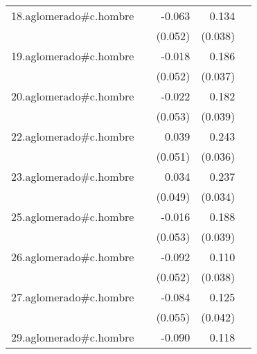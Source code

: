 {\begin{longtable}{l*{4}{D{.}{.}{-1}}}
\addlinespace
18.aglomerado#c.hombre&                     &      -0.063         &       0.134\sym{***}&                     \\
            &                     &     (0.052)         &     (0.038)         &                     \\
\addlinespace
19.aglomerado#c.hombre&                     &      -0.018         &       0.186\sym{***}&                     \\
            &                     &     (0.052)         &     (0.037)         &                     \\
\addlinespace
20.aglomerado#c.hombre&                     &      -0.022         &       0.182\sym{***}&                     \\
            &                     &     (0.053)         &     (0.039)         &                     \\
\addlinespace
22.aglomerado#c.hombre&                     &       0.039         &       0.243\sym{***}&                     \\
            &                     &     (0.051)         &     (0.036)         &                     \\
\addlinespace
23.aglomerado#c.hombre&                     &       0.034         &       0.237\sym{***}&                     \\
            &                     &     (0.049)         &     (0.034)         &                     \\
\addlinespace
25.aglomerado#c.hombre&                     &      -0.016         &       0.188\sym{***}&                     \\
            &                     &     (0.053)         &     (0.039)         &                     \\
\addlinespace
26.aglomerado#c.hombre&                     &      -0.092         &       0.110\sym{**} &                     \\
            &                     &     (0.052)         &     (0.038)         &                     \\
\addlinespace
27.aglomerado#c.hombre&                     &      -0.084         &       0.125\sym{**} &                     \\
            &                     &     (0.055)         &     (0.042)         &                     \\
\addlinespace
29.aglomerado#c.hombre&                     &      -0.090         &       0.118\sym{***}&                     \\

\end{longtable}}
